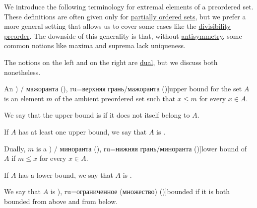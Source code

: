 \begin{definition}\label{def:extremal_points}
  We introduce the following terminology for extremal elements of a preordered set. These definitions are often given only for \hyperref[def:partially_ordered_set]{partially ordered sets}, but we prefer a more general setting that allows us to cover some cases like the \hyperref[thm:semiring_divisibility_order]{divisibility preorder}. The downside of this generality is that, without \hyperref[def:binary_relation/antisymmetric]{antisymmetry}, some common notions like maxima and suprema lack uniqueness.

  The notions on the left and on the right are \hyperref[thm:preorder_duality]{dual}, but we discuss both nonetheless.

  \begin{thmenum}
    \begin{paracol}{2}
      \begin{leftcolumn}
        An \term[bg=горна граница (\cite[18]{Тагамлицки1971Диф}) / мажоранта (\cite[10]{Проданов1982ФункАнализТом1}), ru=верхняя грань/мажоранта (\cite[def. 3.8]{Гуров2013Решётки})]{upper bound} for the set \( A \) is an element \( m \) of the ambient preordered set such that \( x \leq m \) for every \( x \in A \).

        We say that the upper bound is  if it does not itself belong to \( A \).

        If \( A \) has at least one upper bound, we say that \( A \) is .
      \end{leftcolumn}

      \begin{rightcolumn}
        Dually, \( m \) is a \term[bg=долна граница (\cite[18]{Тагамлицки1971Диф}) / миноранта (\cite[10]{Проданов1982ФункАнализТом1}), ru=нижняя грань/миноранта (\cite[def. 3.8]{Гуров2013Решётки})]{lower bound} of \( A \) if \( m \leq x \) for every \( x \in A \).

        If \( A \) has a lower bound, we say that \( A \) is .

        We say that \( A \) is \term[bg=ограничено (множество) (\cite[19]{Тагамлицки1971Диф}), ru=ограниченное (множество) (\cite[39]{Зорич2019АнализТом1})]{bounded} if it is both bounded from above and from below.
      \end{rightcolumn}
    \end{paracol}


\end{thmenum}
\end{definition}
